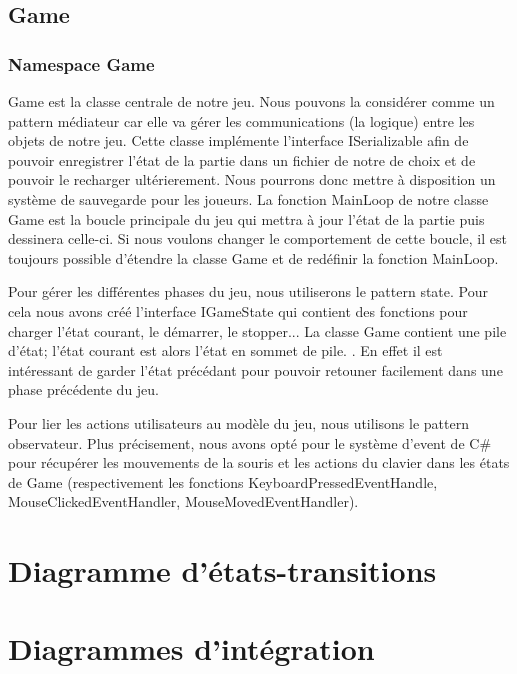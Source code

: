	\subsection{Game}	
		\subsubsection{Namespace Game}
				Game est la classe centrale de notre jeu. 
				Nous pouvons la considérer comme un pattern médiateur car elle va gérer les communications (la logique) entre les objets de notre jeu.
			Cette classe implémente l'interface ISerializable afin de pouvoir enregistrer l'état de la partie dans un fichier de notre de choix et de pouvoir le recharger
			ultérierement. Nous pourrons donc mettre à disposition un système de sauvegarde pour les joueurs. 
			La fonction MainLoop de notre classe Game est la boucle principale du jeu qui mettra à jour l'état de la partie puis dessinera celle-ci. 
			Si nous voulons changer le comportement de cette boucle, il est toujours possible d'étendre la classe Game et de redéfinir la fonction MainLoop.

				Pour gérer les différentes phases du jeu, nous utiliserons le pattern state. 
			Pour cela nous avons créé l'interface IGameState qui contient des fonctions pour charger l'état courant, le démarrer, le stopper...
			La classe Game contient une pile d'état; l'état courant est alors l'état en sommet de pile. .
			En effet il est intéressant de garder l'état précédant pour pouvoir retouner facilement dans une phase précédente du jeu.

				Pour lier les actions utilisateurs au modèle du jeu, nous utilisons le pattern observateur. Plus précisement, nous avons opté pour le système d'event de C\#
			pour récupérer les mouvements de la souris et les actions du clavier dans les états de Game (respectivement les fonctions KeyboardPressedEventHandle,  MouseClickedEventHandler, MouseMovedEventHandler).
			
\section{Diagramme d'états-transitions}

\section{Diagrammes d'intégration}







































